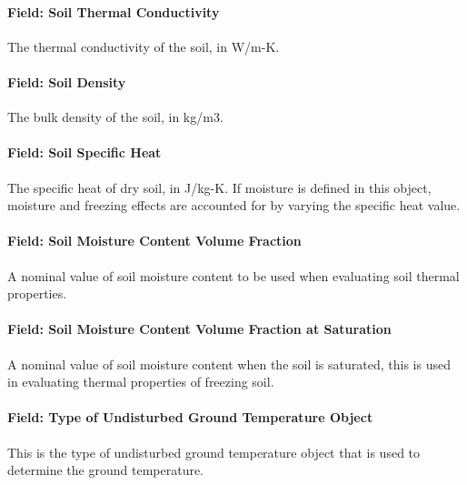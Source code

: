 \paragraph{Field: Soil Thermal Conductivity}\label{field-soil-thermal-conductivity-4}

The thermal conductivity of the soil, in W/m-K.

\paragraph{Field: Soil Density}\label{field-soil-density-4}

The bulk density of the soil, in kg/m3.

\paragraph{Field: Soil Specific Heat}\label{field-soil-specific-heat-4}

The specific heat of dry soil, in J/kg-K. If moisture is defined in this object, moisture and freezing effects are accounted for by varying the specific heat value.

\paragraph{Field: Soil Moisture Content Volume Fraction}\label{field-soil-moisture-content-volume-fraction-2}

A nominal value of soil moisture content to be used when evaluating soil thermal properties.

\paragraph{Field: Soil Moisture Content Volume Fraction at Saturation}\label{field-soil-moisture-content-volume-fraction-at-saturation-2}

A nominal value of soil moisture content when the soil is saturated, this is used in evaluating thermal properties of freezing soil.

\paragraph{Field: Type of Undisturbed Ground Temperature Object}\label{field-type-of-undisturbed-ground-temperature-object-1-000}

This is the type of undisturbed ground temperature object that is used to determine the ground temperature.

